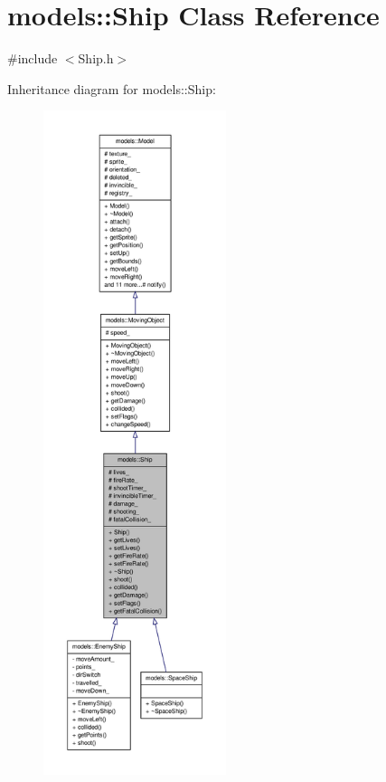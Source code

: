 \hypertarget{classmodels_1_1Ship}{\section{models\-:\-:\-Ship \-Class \-Reference}
\label{d0/d37/classmodels_1_1Ship}
}


{\ttfamily \#include $<$\-Ship.\-h$>$}



\-Inheritance diagram for models\-:\-:\-Ship\-:\nopagebreak
\begin{figure}[H]
\begin{center}
\leavevmode
\includegraphics[height=550pt]{d9/d8d/classmodels_1_1Ship__inherit__graph}
\end{center}
\end{figure}



